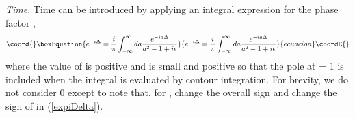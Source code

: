 \documentclass[a4paper,12pt]{article}
\begin{document}
	{\textit{Time}}. Time can be introduced by applying an integral expression \cite{feynman2} for the phase factor \coordHE{} ,
\begin{equation}\coord{}\boxEquation{ \label{expiDelta}	
e^{-i \Delta} = \frac{i}{ \pi} \int_{-\infty}^{\infty} da \frac{e^{-ia\Delta}}{a^2-1+i\epsilon}
}{ e^{-i \Delta} = \frac{i}{ \pi} \int_{-\infty}^{\infty} da \frac{e^{-ia\Delta}}{a^2-1+i\epsilon}
}{ecuacion}\coordE{}\end{equation}
where the value of \myHighlight{$\Delta$}\coordHE{} is positive and \myHighlight{$\epsilon$}\coordHE{} is small and positive so that the pole at \coordHE{} = 1 is included when the integral is evaluated by contour integration.  For brevity, we do not consider \myHighlight{$\Delta <$}\coordHE{} 0 except to note that, for \coordHE{}, change the overall sign and change the sign of \myHighlight{$\epsilon$}\coordHE{} in (\ref{expiDelta}).
\end{document}
